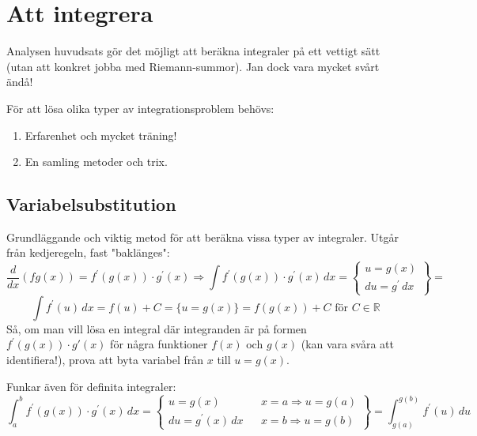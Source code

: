\chapter{Att integrera}
Analysen huvudsats gör det möjligt att beräkna integraler på ett vettigt sätt (utan att konkret jobba med Riemann-summor).
Jan dock vara mycket svårt ändå!

För att lösa olika typer av integrationsproblem behövs:
\begin{enumerate}
    \item Erfarenhet och mycket träning!
    \item En samling metoder och trix.
\end{enumerate}

\section*{Variabelsubstitution}
Grundläggande och viktig metod för att beräkna vissa typer av integraler.
Utgår från kedjeregeln, fast "baklänges":
\begin{equation*}
    \frac{d}{dx}(fg(x))=f^\prime(g(x))\cdot g^\prime(x)\Rightarrow
    \int f^\prime(g(x))\cdot g^\prime(x)\, dx=
    \left\lbrace\begin{matrix}
        u=g(x) \\
        du=g^\prime\, dx
    \end{matrix}\right\rbrace =
\end{equation*}
\begin{equation*}
    \int f^\prime(u)\, dx=
    f(u)+C=\{u=g(x)\}=f(g(x))+C\text{ för } C\in\mathbb{R}
\end{equation*}
Så, om man vill lösa en integral där integranden är på formen $f^\prime(g(x))\cdot g\prime(x)$ för några funktioner $f(x)$ och $g(x)$ (kan vara svåra att identifiera!),
prova att byta variabel från $x$ till $u=g(x)$.

Funkar även för definita integraler:
\begin{equation*}
    \int_a^b f^\prime(g(x))\cdot g^\prime(x)\, dx=
    \left\lbrace\begin{matrix}
        u=g(x)              &  & x=a\Rightarrow u=g(a) \\
        du=g^\prime(x)\, dx &  & x=b\Rightarrow u=g(b)
    \end{matrix}\right\rbrace =
    \int_{g(a)}^{g(b)}f^\prime(u)\, du
\end{equation*}

